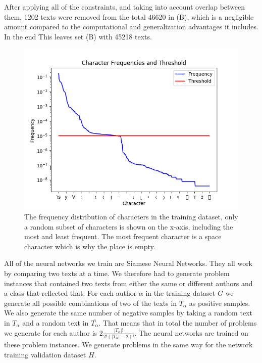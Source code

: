 After applying all of the constraints, and taking into account
overlap between them, 1202 texts were removed from the total 46620 in (B),
which is a negligible amount compared to the computational and generalization
advantages it includes.
In the end This leaves set (B) with 45218 texts.

\begin{figure}[htb]
    \centering
    \includegraphics[scale=.8]{./pictures/data/character_frequencies.png}
    \caption{The frequency distribution of characters in the training dataset,
        only a random subset of characters is shown on the x-axis, including the
        most and least frequent. The most frequent character is a space
        character which is why the place is empty.}
    \label{fig:character_frequencies}
\end{figure}

All of the neural networks we train are Siamese Neural Networks. They all
work by comparing two texts at a time. We therefore had to generate problem
instances that contained two texts from either the same or different authors and
a class that reflected that. For each author $\alpha$ in the training dataset
$G$ we generate all possible combinations of two of the texts in $T_\alpha$
as positive samples. We also generate the same number of negative samples by
taking a random text in $T_\alpha$ and a random text in $\overline{T_\alpha}$.
That means that in total the number of problems we generate for each author
is $2\frac{\left|T_\alpha\right|!}{2!(\left|T_\alpha\right|-2)!}$. The neural
networks are trained on these problem instances. We generate problems in the
same way for the network training validation dataset $H$.
